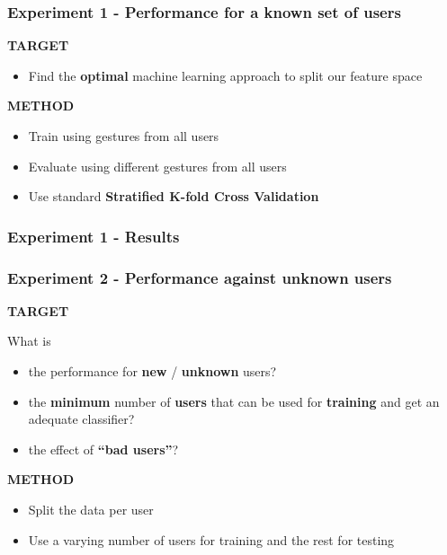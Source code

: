 \begin{frame}
\frametitle{Experiment 1 - Performance for a known set of users}
\textbf{TARGET}
\begin{itemize}
\item Find the \textbf{optimal} machine learning approach to split our feature space
\end{itemize}

\textbf{METHOD}
\begin{itemize}
\item Train using gestures from all users
\item Evaluate using different gestures from all users
\item Use standard \textbf{Stratified K-fold Cross Validation}
\end{itemize}
\end{frame}


\begin{frame}
\frametitle{Experiment 1 - Results}
\end{frame}



\begin{frame}
\frametitle{Experiment 2 - Performance against unknown users}

\textbf{TARGET}

What is
\begin{itemize}
\item the performance for \textbf{new} / \textbf{unknown} users?
\item the \textbf{minimum} number of \textbf{users} that can be used for \textbf{training} and get an adequate classifier?
\item the effect of \textbf{``bad users''}?
\end{itemize}

\textbf{METHOD}

\begin{itemize}
\item Split the data per user
\item Use a varying number of users for training and the rest for testing
\end{itemize}

\end{frame}


